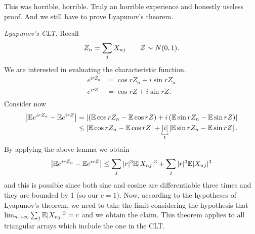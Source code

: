 \documentclass{report}
\begin{document}
This was horrible, horrible. Truly an horrible experience and honestly useless proof. And we still have to prove Lyapunov's theorem. 
\begin{fancyproof}
	\emph{Lyapunov's CLT}. Recall
	\begin{equation*}
		Z_{n}=\sum_{j}X_{nj}\qquad Z\sim N(0,1).
	\end{equation*}
	We are interested in evaluating the characteristic function.
	\begin{align*}
		e^{irZ_n}&=\cos rZ_n+i\sin rZ_n\\
		e^{irZ}&=\cos rZ+i\sin rZ.\\
	\end{align*}
	Consider now
	\begin{align*}
		\left|\ev e^{irZ_n}-\ev e^{irZ}\right|&=\left|\left(\ev\cos rZ_n-\ev\cos rZ\right)+i\left(\ev\sin rZ_n-\ev\sin rZ\right)\right|\\
		&\leq\left|\ev\cos rZ_n-\ev\cos rZ\right|+\underbracket[0.4pt]{|i|}_{1}\left|\ev\sin rZ_n-\ev\sin rZ\right|.
	\end{align*}
	By applying the above lemma  we obtain
	\begin{equation*}
		\left|\mathbb{E} e^{irZ_n}-\mathbb{E} e^{irZ}\right|\leq\sum_j|r|^{3}\mathbb{E}|X_{nj}|^{3}+\sum_{j}|r|^{3}\mathbb{E}|X_{nj}|^{3}
	\end{equation*}
	and this is possible since both sine and cosine are differentiable three times and they are bounded by 1 (so our $c=1$). Now, according to the hypotheses of Lyapunov's theorem, we need to take the limit considering the hypothesis that $\lim_{n\to\infty}\sum_j\mathbb{E}|X_{nj}|^{3}=c$ and we obtain the claim. This theorem applies to all triangular arrays which include the one in the CLT.
\end{fancyproof}
\end{document}
